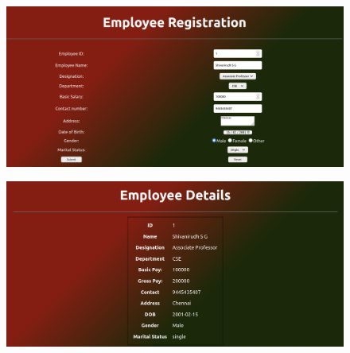 \documentclass[12pt,letterpaper]{article}
\begin{document}
\subsubsection*{{}}
\begin{flushleft}
    
\end{flushleft}

\subsubsection*{{}}
\begin{flushleft}
    
\end{flushleft}

\subsubsection*{{}}
\begin{flushleft}
    
\end{flushleft}

\newpage
\subsection*{}
\begin{figure}[h]
    \centering
    \includegraphics[width = \textwidth]{Pics/reg1.png}
\end{figure}
\begin{figure}[h!]
    \centering
    \includegraphics[width = \textwidth]{Pics/reg2.png}
\end{figure}
\end{document}
